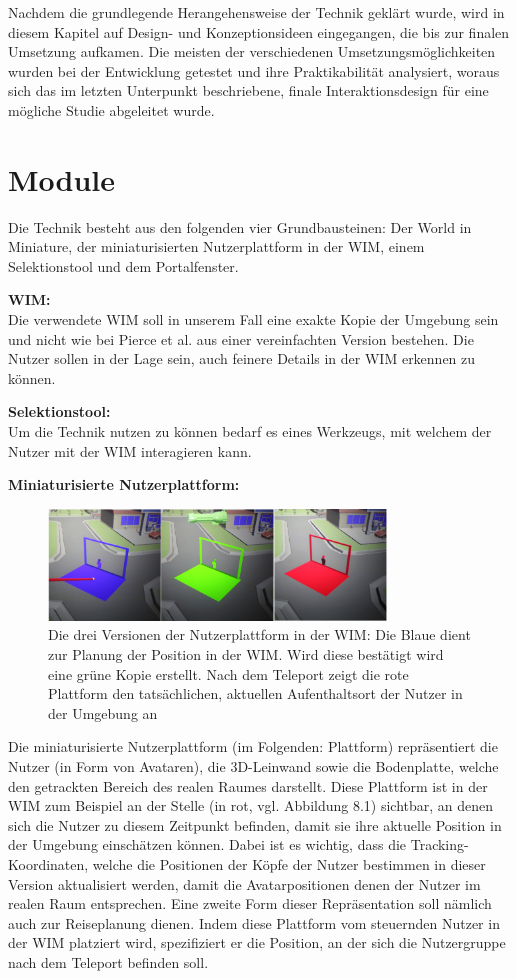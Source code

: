 Nachdem die grundlegende Herangehensweise der Technik geklärt wurde, wird in diesem Kapitel auf Design- und Konzeptionsideen eingegangen, die bis zur finalen Umsetzung aufkamen. Die meisten der verschiedenen Umsetzungsmöglichkeiten wurden bei der Entwicklung getestet und ihre Praktikabilität analysiert, woraus sich das im letzten Unterpunkt beschriebene, finale Interaktionsdesign für eine mögliche Studie abgeleitet wurde.

\section{Module}
Die Technik besteht aus den folgenden vier Grundbausteinen: Der World in Miniature, der miniaturisierten Nutzerplattform in der WIM, einem Selektionstool und dem Portalfenster.

\textbf{WIM:}\\
Die verwendete WIM soll in unserem Fall eine exakte Kopie der Umgebung sein und nicht wie bei Pierce et al. aus einer vereinfachten Version bestehen. Die Nutzer sollen in der Lage sein, auch feinere Details in der WIM erkennen zu können. 

 \textbf{Selektionstool:}\\
Um die Technik nutzen zu können bedarf es eines Werkzeugs, mit welchem der Nutzer mit der WIM interagieren kann. 

\textbf{Miniaturisierte Nutzerplattform:}\\
\begin{figure}[h!]
  \centering
  \includegraphics[width=0.8\textwidth]{images/platform_bgr.jpg}
  \caption{Die drei Versionen der Nutzerplattform in der WIM: Die Blaue dient zur Planung der Position in der WIM. Wird diese bestätigt wird eine grüne Kopie erstellt. Nach dem Teleport zeigt die rote Plattform den tatsächlichen, aktuellen Aufenthaltsort der Nutzer in der Umgebung an}
  \label{fig:todo}
\end{figure}
Die miniaturisierte Nutzerplattform (im Folgenden: Plattform) repräsentiert die Nutzer (in Form von Avataren), die 3D-Leinwand sowie die Bodenplatte, welche den getrackten Bereich des realen Raumes darstellt. Diese Plattform ist in der WIM zum Beispiel an der Stelle (in rot, vgl. Abbildung 8.1) sichtbar, an denen sich die Nutzer zu diesem Zeitpunkt befinden, damit sie ihre aktuelle Position in der Umgebung einschätzen können. Dabei ist es wichtig, dass die Tracking-Koordinaten, welche die Positionen der Köpfe der Nutzer bestimmen in dieser Version aktualisiert werden, damit die Avatarpositionen denen der Nutzer im realen Raum entsprechen. Eine zweite Form dieser Repräsentation soll nämlich auch zur Reiseplanung dienen. Indem diese Plattform vom steuernden Nutzer in der WIM platziert wird, spezifiziert er die Position, an der sich die Nutzergruppe nach dem Teleport befinden soll.

